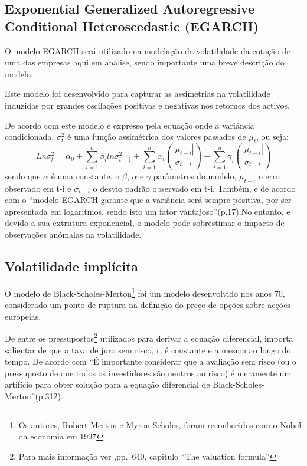 \documentclass[
  12pt,
  a4paper,
  openany]{book}
\begin{document}
\hypertarget{exponential-generalized-autoregressive-conditional-heteroscedastic-egarch}{%
\subsection{Exponential Generalized Autoregressive Conditional Heteroscedastic (EGARCH)}\label{exponential-generalized-autoregressive-conditional-heteroscedastic-egarch}}

O modelo EGARCH será utilizado na modelação da volatilidade da cotação de uma das empresas aqui em análise, sendo importante uma breve descrição do modelo.

Este modelo foi desenvolvido para capturar as assimetrias na volatilidade induzidas por grandes oscilações positivas e negativas nos retornos dos activos.

De acordo com \citet{marta} este modelo é expresso pela equação onde a variância condicionada, \(\sigma_t^2\) é uma função assimétrica dos valores passados de \(\mu_t\), ou seja:
\begin{equation} 
  Ln \sigma_{t}^{2}= \alpha_0+\sum_{i=1}^n\beta_iln\sigma_{t-1}^2+\sum_{i=1}^n\alpha_i(\frac{|\mu_{t-i}|}{\sigma_{t-i}})+\sum_{i=1}^n\gamma_i(\frac{|\mu_{t-i}|}{\sigma_{t-i}})
  \label{eq:egarch}
\end{equation}
sendo que \(\alpha\) é uma constante, o \(\beta\), \(\alpha\) e \(\gamma\) parâmetros do modelo, \(\mu_{t-i}\) o erro observado em t-i e \(\sigma_{t-i}\) o desvio padrão observado em t-i. Também, e de acordo com \citet{marta} o ``modelo EGARCH garante que a variância será sempre positiva, por ser apresentada em logaritmos, sendo isto um fator vantajoso''(p.17).No entanto, e devido a sua extrutura exponencial, o modelo pode sobrestimar o impacto de observações anómalas na volatilidade.

\hypertarget{volatilidade-impluxedcita}{%
\subsection{Volatilidade implícita}\label{volatilidade-impluxedcita}}

O modelo de Black-Scholes-Merton\footnote{Os autores, Robert Merton e Myron Scholes, foram reconhecidos com o Nobel da economia em 1997} foi um modelo desenvolvido nos anos 70, considerado um ponto de ruptura na definição do preço de opções sobre acções europeias.

De entre os pressupostos\footnote{Para mais informação ver \citet{BlackScholes},pp.~640, capitulo ``The valuation formula''} utilizados para derivar a equação diferencial, importa salientar de que a taxa de juro sem risco, r, é constante e a mesma ao longo do tempo. De acordo com \citet{Hull2018} ``É importante considerar que a avaliação sem risco (ou o pressuposto de que todos os investidores são neutros ao risco) é meramente um artifício para obter solução para a equação diferencial de Black-Scholes-Merton''(p.312).
\end{document}
